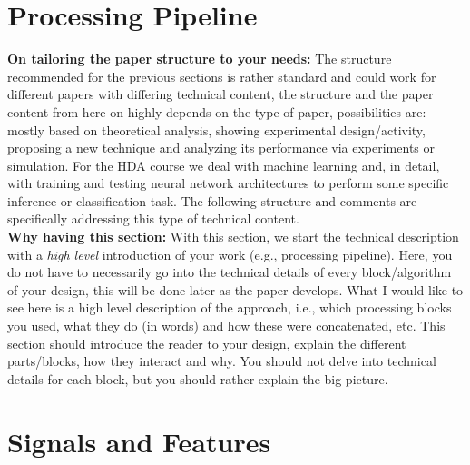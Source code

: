 
\section{Processing Pipeline}
\label{sec:processing_architecture}

\textbf{On tailoring the paper structure to your needs:} The structure recommended for the previous sections is rather standard and could work for different papers with differing technical content, the structure and the paper content from here on highly depends on the type of paper, possibilities are: mostly based on theoretical analysis, showing experimental design/activity, proposing a new technique and analyzing its performance via experiments or simulation. For the HDA course we deal with machine learning and, in detail, with training and testing neural network architectures to perform some specific inference or classification task. The following structure and comments are specifically addressing this type of technical content.\\

\textbf{Why having this section:} With this section, we start the technical description with a {\it high level} introduction of your work (e.g., processing pipeline). Here, you do not have to necessarily go into the technical details of every block/algorithm of your design, this will be done later as the paper develops. What I would like to see here is a high level description of the approach, i.e., which processing blocks you used, what they do (in words) and how these were concatenated, etc. This section should introduce the reader to your design, explain the different parts/blocks, how they interact and why. You should not delve into technical details for each block, but you should rather explain the big picture.  

\section{Signals and Features}
\label{sec:model}


